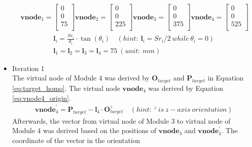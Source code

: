 \begin{itemize}
\begin{align}
        &\textbf{vnode}_{1} = \begin{bmatrix} 0 \\ 0 \\ 75 \\ \end{bmatrix} 
        \textbf{vnode}_{2} = \begin{bmatrix} 0 \\ 0 \\ 225 \\ \end{bmatrix} 
        \textbf{vnode}_{3} = \begin{bmatrix} 0 \\ 0 \\ 375 \\ \end{bmatrix} 
        \textbf{vnode}_{4} = \begin{bmatrix} 0 \\ 0 \\ 525 \\ \end{bmatrix} 
        \label{eq:virtual_node_initial} 
    \end{align}
    \vspace{-10mm}
    \begin{align}
        &\textbf{l}_{i} = \frac{Sr_i}{\theta_i}\cdot \tan(\theta_i)
        \quad (hint: \ \textbf{l}_{i} = {Sr}_i/2 \ while \ \theta_i = 0) \label{eq:virtual_length}\\
        &\textbf{l}_{1} = \textbf{l}_{2} = \textbf{l}_{3} = \textbf{l}_{4} = 75 \ (unit: \ mm) \nonumber
    \end{align}
    \item Iteration 1 \\ %
    The virtual node of Module 4 was derived by $\textbf{O}_{target}$ and $\textbf{P}_{target}$ in Equation 
    \ref{eq:target_homo}. The virtual node $\textbf{vnode}_{4}$ was derived by Equation \ref{eq:vnode4_origin}.
    \vspace{-5mm}
    \begin{align}
        &\textbf{vnode}_{4}^{'} = \textbf{P}_{target} - \textbf{l}_{4} \cdot \textbf{O}_{target}^{z} \quad 
        (hint: \ ^{z} \ is \ z-axis \ orientation)
        \label{eq:vnode4_origin}
    \end{align}
    Afterwards, the vector from virtual node of Module 3 to virtual node of Module 4 was derived based on the 
    positions of $\textbf{vnode}_{3}$ and $\textbf{vnode}_{4}^{'}$. The coordinate of the vector in the orientation 

\end{itemize}
